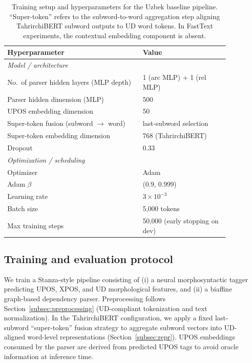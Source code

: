 \documentclass[runningheads]{llncs}
\begin{document}
\begin{table}[t]
\centering
\small
\begin{tabular}{p{0.55\linewidth}p{0.35\linewidth}}
\toprule
\textbf{Hyperparameter} & \textbf{Value} \\
\midrule
\multicolumn{2}{l}{\textit{Model / architecture}} \\
\midrule
No.\ of parser hidden layers (MLP depth) & 1 (arc MLP) + 1 (rel MLP) \\
Parser hidden dimension (MLP) & 500 \\
UPOS embedding dimension & 50 \\
Super-token fusion (subword $\to$ word) & last-subword selection \\
Super-token embedding dimension & 768 (TahrirchiBERT) \\
Dropout & 0.33 \\
\midrule
\multicolumn{2}{l}{\textit{Optimization / scheduling}} \\
\midrule
Optimizer & Adam \\
Adam $\beta$ & (0.9, 0.999) \\
Learning rate & $3 \times 10^{-3}$ \\
Batch size & 5{,}000 tokens \\
Max training steps & 50{,}000 (early stopping on dev) \\
\bottomrule
\end{tabular}
\caption{Training setup and hyperparameters for the Uzbek baseline pipeline. ``Super-token'' refers to the subword-to-word aggregation step aligning TahrirchiBERT subword outputs to UD word tokens. In FastText experiments, the contextual embedding component is absent.}
\label{tab:hyperparams}
\end{table}

\subsection{Training and evaluation protocol}
We train a Stanza-style pipeline consisting of (i) a neural morphosyntactic tagger predicting UPOS, XPOS, and UD morphological features, and (ii) a biaffine graph-based dependency parser. Preprocessing follows Section~\ref{subsec:preprocessing} (UD-compliant tokenization and text normalization). In the TahrirchiBERT configuration, we apply a fixed last-subword ``super-token'' fusion strategy to aggregate subword vectors into UD-aligned word-level representations (Section~\ref{subsec:repr}). UPOS embeddings consumed by the parser are derived from predicted UPOS tags to avoid oracle information at inference time.
\end{document}
